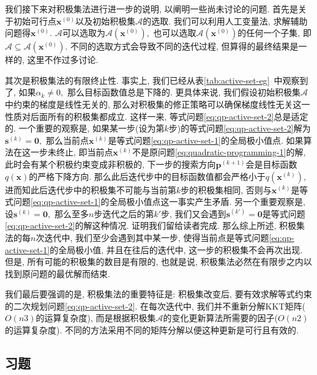 \documentclass{SBCbookchapter}
\newcommand{\V}[1]{{\bm{#1}}}
\numberwithin{equation}{section}
\begin{document}
我们接下来对积极集法进行进一步的说明, 以阐明一些尚未讨论的问题. 首先是关于初始可行点$\V{x}^{(0)}$以及初始积极集$\mathcal{A}$的选取. 我们可以利用人工变量法, 求解辅助问题得$\V{x}^{(0)}.$ $\mathcal{A}$可以选取为$\mathcal{A}(\V{x}^{(0)}),$ 也可以选取$\mathcal{A}(\V{x}^{(0)})$的任何一个子集, 即$\mathcal{A} \subseteq \mathcal{A}(\V{x}^{(0)}).$ 不同的选取方式会导致不同的迭代过程, 但算得的最终结果是一样的, 这里不作过多讨论.

其次是积极集法的有限终止性. 事实上, 我们已经从表\ref{tab:active-set-eg}~中观察到了, 如果$\alpha_k \neq 0,$ 那么目标函数值总是下降的. 更具体来说, 我们假设初始积极集$\mathcal{A}$中约束的梯度是线性无关的, 那么对积极集的修正策略可以确保梯度线性无关这一性质对后面所有的积极集都成立. 这样一来, 等式问题\eqref{eq:qp-active-set-2}总是适定的. 一个重要的观察是, 如果某一步(设为第$k$步)的等式问题\eqref{eq:qp-active-set-2}解为$\V{s}^{(k)} = \V{0},$ 那么当前点$\V{x}^{(k)}$是等式问题\eqref{eq:qp-active-set-1}的全局极小值点. 如果算法在这一步未终止, 即当前点$\V{x}^{(k)}$不是原问题\eqref{eq:quadratic-programming-1}的解, 此时会有某个积极约束变成非积极的, 下一步的搜索方向$\V{p}^{(k+1)}$会是目标函数$q(\V{x})$的严格下降方向. 那么此后迭代步中的目标函数值都会严格小于$q(\V{x}^{(k)}),$ 进而知此后迭代步中的积极集不可能与当前第$k$步的积极集相同, 否则与$\V{x}^{(k)}$是等式问题\eqref{eq:qp-active-set-1}的全局极小值点这一事实产生矛盾. 另一个重要观察是, 设$\V{s}^{(k)} = \V{0},$ 那么至多$n$步迭代之后的第$k'$步, 我们又会遇到$\V{s}^{(k')} = \V{0}$是等式问题\eqref{eq:qp-active-set-2}的解这种情况. 证明我们留给读者完成. 那么综上所述, 积极集法的每$n$次迭代中, 我们至少会遇到其中某一步, 使得当前点是等式问题\eqref{eq:qp-active-set-1}的全局极小值, 并且在往后的迭代中, 这一步的积极集不会再次出现. 但是, 所有可能的积极集的数目是有限的, 也就是说, 积极集法必然在有限步之内以找到原问题的最优解而结束.

我们最后要强调的是, 积极集法的重要特征是: 积极集改变后, 要有效求解等式约束的二次规划问题\eqref{eq:qp-active-set-2}. 在每次迭代中, 我们并不重新分解KKT矩阵($O(n3)$的运算复杂度), 而是根据积极集$\mathcal{A}$的变化更新算法所需要的因子($O(n2)$的运算复杂度). 不同的方法采用不同的矩阵分解以便这种更新是可行且有效的.


\subsection*{习题}
\end{document}
